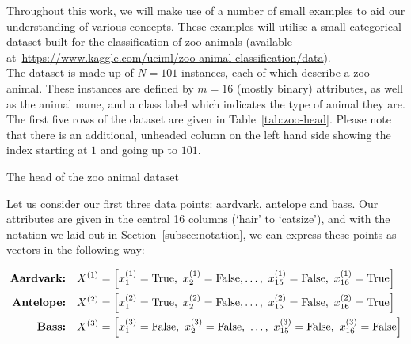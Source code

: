 \begin{example}\label{ex:dissim}
    Throughout this work, we will make use of a number of small examples to aid 
    our understanding of various concepts. These examples will utilise a small 
    categorical dataset built for the classification of zoo animals (available
    at~\url{https://www.kaggle.com/uciml/zoo-animal-classification/data}).\\

    The dataset is made up of \(N = 101\) instances, each of which describe a
    zoo animal. These instances are defined by \(m = 16\) (mostly binary) 
    attributes, as well as the animal name, and a class label which indicates 
    the type of animal they are. The first five rows of the dataset are given in
    Table~\ref{tab:zoo-head}. Please note that there is an additional, unheaded
    column on the left hand side showing the index starting at \(1\) and going 
    up to \(101\).\\
    
    \begin{table}[h]
    \resizebox{\textwidth}{!}{%
        \centering
        
    }
    \caption{The head of the zoo animal dataset}\label{tab:zoo-head}
    \end{table}

    Let us consider our first three data points: aardvark, antelope and bass. 
    Our attributes are given in the central 16 columns (`hair' to `catsize'), 
    and with the notation we laid out in Section~\ref{subsec:notation}, we can 
    express these points as vectors in the following way:

    \begin{equation}
    \nonumber
    \begin{aligned}
        \textbf{Aardvark:} \quad & X^{(1)} = \left[x_1^{(1)} = \true, \ 
            x_2^{(1)} = \false, \ldots, \ x_{15}^{(1)} = \false, \ x_{16}^{(1)} 
            = \true\right]
        \\
        \textbf{Antelope:} \quad & X^{(2)} = \left[x_1^{(2)} = \true, \
            x_2^{(2)} = \false, \ldots, \ x_{15}^{(2)} = \false, \ x_{16}^{(2)} 
            = \true\right]
        \\
        \textbf{Bass:} \quad & X^{(3)} = \left[x_1^{(3)} = \false, \ x_2^{(3)} =
            \false, \ \ldots, \ x_{15}^{(3)} = \false, \ x_{16}^{(3)} = 
            \false\right]
        \\
    \end{aligned}
    \end{equation}


\end{example}
